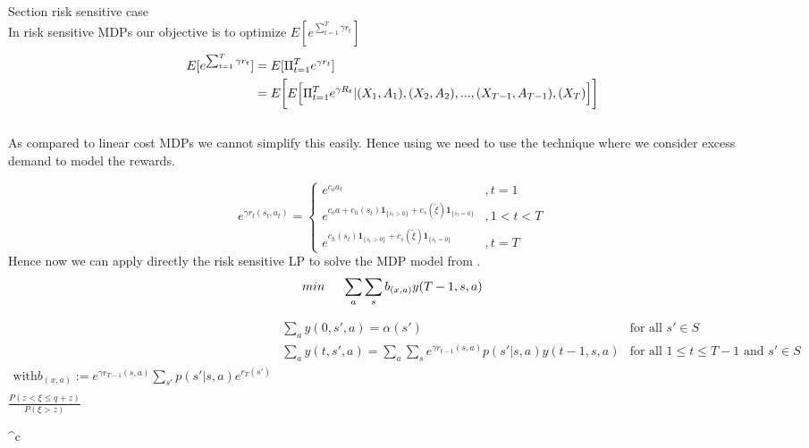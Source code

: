 \documentclass[12pt,a4paper,oneside]{report}
\begin{document}
\noindent Section risk sensitive case\\
In risk sensitive MDPs our objective is to optimize $E[e^{\sum_{t=1}^T \gamma r_t}]$
\begin{align*}
E[e^{\sum_{t=1}^T \gamma r_t}]&=E[\Pi_{t=1}^Te^{ \gamma r_t}]\\
&=E \bigg{[}E\Big[\Pi_{t=1}^{T}e^{\gamma R_t}|{(X_1,A_1),(X_2,A_2),...,(X_{T-1},A_{T-1}),(X_T)}\Big]\bigg]
\end{align*}
\\ As compared to linear cost MDPs we cannot simplify this easily. Hence using we need to use the technique where we consider excess demand to model the rewards.

\begin{equation*}
e^{\gamma r_t(s_t,a_t)}=
\begin{cases}
e^{c_{o}a_t}&,t=1\\
e^{c_{o}a + c_h(s_t)\mathbf{1}_{\lbrace s_t>0\rbrace} + c_s(\tilde{\xi})\mathbf{1}_{\lbrace s_t=0\rbrace}}&,1<t< T\\
e^{c_h(s_t)\mathbf{1}_{\lbrace s_t>0\rbrace} + c_s(\tilde{\xi})\mathbf{1}_{\lbrace s_t=0\rbrace}}&,t=T
\end{cases}
\end{equation*}
Hence now we can apply directly the risk sensitive LP to solve the MDP model from \citep{kumar2015finite}.
\begin{align*}
\nonumber
min\hspace{0.5cm} \sum_a \sum_{s} b_{(x,a)}y(T-1,s,a) 
\end{align*}
\begin{flushleft}
\end{flushleft}
\begin{align*}
& \sum_a y(0,s',a)=\alpha(s')     &\text{for all } s'\in S \\
& \sum_a y(t,s',a)= \sum_a \sum_s e^{\gamma r_{t-1}(s,a)}p(s'|s,a)y(t-1,s,a)    &\text{for all } 1\leq t\leq T-1 \text{ and } s'\in S   \\
\text{with} b_{(x,a)}:= e^{\gamma r_{T-1}(s,a)}\sum_{s'} p(s'|s,a)e^{r_T(s')} \\
\end{align*}
$\frac{P(z<\xi\leq q+z)}{P(\xi >z)}$

\begin{myequation}^c\end{myequation}
\nocite{*}


\end{document}
